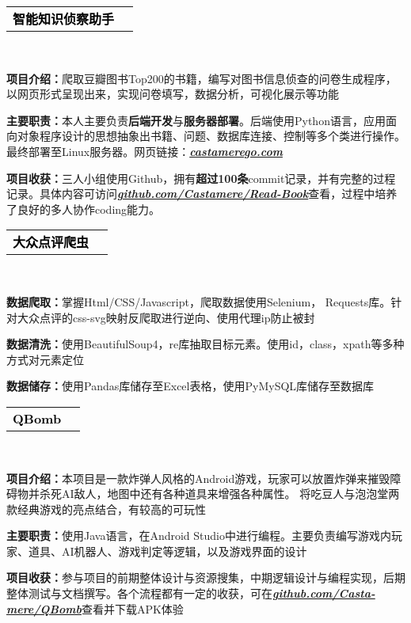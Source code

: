 \documentclass[10pt,A4]{article}
\renewcommand{\CJKglue}{\hskip 1.5pt}
\newcommand{\mpwidth}{\linewidth-\fboxsep-\fboxsep} %
\newcommand{\cvlist}[1] {


	\begin{itemize}
        {#1}
    \end{itemize}

    \vspace{3pt}

    }
\newcommand{\project}[3] {
    \vspace{2pt}

	\parbox{\mpwidth}{
		\begin{tabular*}{1\mpwidth}{p{0.65\mpwidth}  r}
            {\Large \textcolor{black}{\textbf{#2}}} & \colorbox{maincol}{\makebox[0.33\mpwidth]{\textcolor{white}{\textbf{#1}}}} \\
		\end{tabular*}\\
	}
    \begingroup
        \setlength{\baselineskip}{15pt}
        \renewcommand{\CJKglue}{\hskip 1.5pt}
        #3
    \endgroup
}
\begin{document}
\begin{paracol}{2}
\begin{leftcolumn}
        \project
        {2022-09\enspace 至\enspace 2022-12}
        {智能知识侦察助手}
        {\cvlist{
                \item \textbf{项目介绍：}爬取豆瓣图书Top200的书籍，编写对图书信息侦查的问卷生成程序，以网页形式呈现出来，实现问卷填写，数据分析，可视化展示等功能
                \item \textbf{主要职责：}本人主要负责\textbf{后端开发}与\textbf{服务器部署}。后端使用Python语言，应用面向对象程序设计的思想抽象出书籍、问题、数据库连接、控制等多个类进行操作。最终部署至Linux服务器。网页链接：\href{http://castamerego.com/}{\textbf{\emph{castamerego.com}}}
                \item \textbf{项目收获：}三人小组使用Github，拥有\textbf{超过100条}commit记录，并有完整的过程记录。具体内容可访问\enspace \href{https://github.com/Castamere/Read-Book}{\textbf{\emph{github.com/Castamere/Read-Book}}}\enspace 查看，过程中培养了良好的多人协作coding能力。
            }
        }

        \vspace{5pt}

        \project
        {2021-09\enspace 至\enspace 2021-10}
        {大众点评爬虫}
        {\cvlist{
                \item \textbf{数据爬取：}掌握Html/CSS/Javascript，爬取数据使用Selenium， Requests库。针对大众点评的css-svg映射反爬取进行逆向、使用代理ip防止被封
                \item \textbf{数据清洗：}使用BeautifulSoup4，re库抽取目标元素。使用id，class，xpath等多种方式对元素定位
                \item \textbf{数据储存：}使用Pandas库储存至Excel表格，使用PyMySQL库储存至数据库
            }
        }
        \vspace{5pt}

        \project
        {2023-05\enspace 至\enspace 2023-06}
        {QBomb}
        {\cvlist{
                \item \textbf{项目介绍：}本项目是一款炸弹人风格的Android游戏，玩家可以放置炸弹来摧毁障碍物并杀死AI敌人，地图中还有各种道具来增强各种属性。 将吃豆人与泡泡堂两款经典游戏的亮点结合，有较高的可玩性
                \item \textbf{主要职责：}使用Java语言，在Android Studio中进行编程。主要负责编写游戏内玩家、道具、AI机器人、游戏判定等逻辑，以及游戏界面的设计
                \item \textbf{项目收获：}参与项目的前期整体设计与资源搜集，中期逻辑设计与编程实现，后期整体测试与文档撰写。各个流程都有一定的收获，可在\href{https://github.com/Casta-mere/QBomb}{\textbf{\emph{github.com/Casta-mere/QBomb}}}查看并下载APK体验
            }
        }
        \vspace{5pt}


\end{leftcolumn}
\end{paracol}
\end{document}
